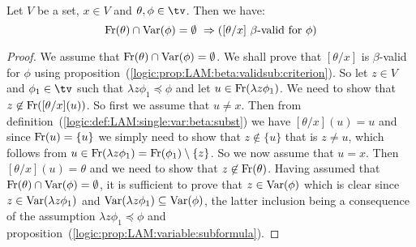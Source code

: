 \begin{prop}\label{logic:prop:LAM:beta:validsub:singlevar}
    Let $V$ be a set, $x\in V$ and $\theta,\phi\in\tv$. Then we have:
        \[
            \mbox{\rm Fr}(\theta)\cap\mbox{\rm Var}(\phi)=\emptyset\
                \Rightarrow
            (\mbox{$[\theta/x]$ $\beta$-valid for $\phi$})
        \]
\end{prop}
\begin{proof}
    We assume that $\mbox{\rm Fr}(\theta)\cap\mbox{\rm Var}(\phi)=\emptyset$. We shall prove
    that $[\theta/x]$ is $\beta$-valid for $\phi$ using 
    proposition~(\ref{logic:prop:LAM:beta:validsub:criterion}). 
    So let $z\in V$ and $\phi_{1}\in\tv$ such that $\lambda z\phi_{1}
    \preceq\phi$ and let $u\in\mbox{\rm Fr}(\lambda z\phi_{1})$. We need to show 
    that $z\not\in\mbox{\rm Fr}([\theta/x](u))$. So first we assume that $u\neq x$. 
    Then from definition~(\ref{logic:def:LAM:single:var:beta:subst}) we have
    $[\theta/x](u)=u$ and since $\mbox{\rm Fr}(u)=\{u\}$ we simply need to show that
    $z\not\in\{u\}$ that is $z\neq u$, which follows from $u\in\mbox{\rm Fr}(\lambda
    z\phi_{1})=\mbox{\rm Fr}(\phi_{1})\setminus\{z\}$. So we now assume that $u=x$.
    Then $[\theta/x](u)=\theta$ and we need to show that $z\not\in\mbox{\rm Fr}(\theta)$.
    Having assumed that $\mbox{\rm Fr}(\theta)\cap\mbox{\rm Var}(\phi)=\emptyset$, it is sufficient
    to prove that $z\in\mbox{\rm Var}(\phi)$ which is clear since $z\in\mbox{\rm Var}(\lambda z
    \phi_{1})$ and $\mbox{\rm Var}(\lambda z\phi_{1})\subseteq\mbox{\rm Var}(\phi)$, the latter
    inclusion being a consequence of the assumption $\lambda z\phi_{1}\preceq
    \phi$ and proposition~(\ref{logic:prop:LAM:variable:subformula}).
\end{proof}

